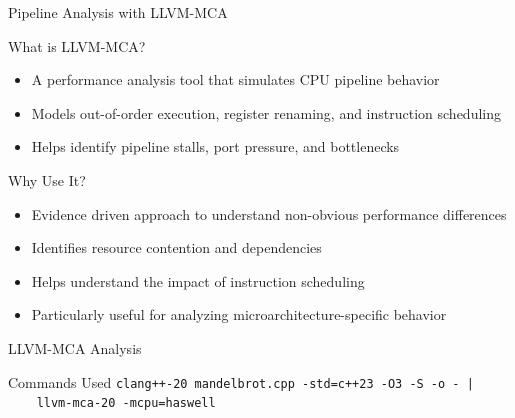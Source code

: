 \documentclass{beamer}
\begin{document}
\begin{frame}{Pipeline Analysis with LLVM-MCA}
    \begin{block}{What is LLVM-MCA?}
        \begin{itemize}
            \item A performance analysis tool that simulates CPU pipeline behavior
            \item Models out-of-order execution, register renaming, and instruction scheduling
            \item Helps identify pipeline stalls, port pressure, and bottlenecks
        \end{itemize}
    \end{block}
    
    \begin{exampleblock}{Why Use It?}
        \begin{itemize}
            \item Evidence driven approach to understand non-obvious performance differences
            \item Identifies resource contention and dependencies
            \item Helps understand the impact of instruction scheduling
            \item Particularly useful for analyzing microarchitecture-specific behavior
        \end{itemize}
    \end{exampleblock}
\end{frame}

\begin{frame}{LLVM-MCA Analysis}
    \begin{block}{Commands Used}
        \texttt{clang++-20 mandelbrot.cpp -std=c++23 -O3 -S -o - |} \\
        \texttt{~~~~llvm-mca-20 -mcpu=haswell}
    \end{block}
\end{frame}
\end{document}
